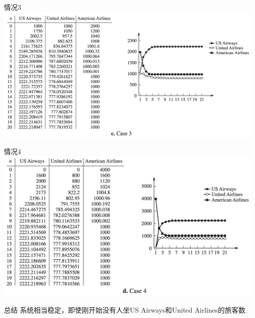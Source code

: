\documentclass[
  ignorenonframetext,
]{ctexbeamer}
\begin{document}
\begin{frame}{情况3}
\label{ux60c5ux51b53-1}
\includegraphics{party-3.png}
\end{frame}

\begin{frame}{情况4}
\label{ux60c5ux51b54}
\includegraphics{party-4.png}
\end{frame}

\begin{frame}{总结}
\label{ux603bux7ed3}
系统相当稳定，即使刚开始没有人坐US Airways和United Airlines的旅客数.
\end{frame}
\end{document}
